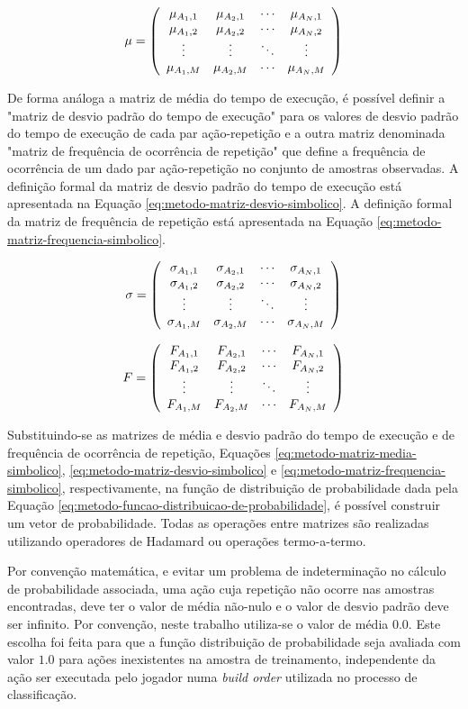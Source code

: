 \begin{equation}
	\mu =  \left(\begin{array}{cccc} {\mu}_{A_1,1} & {\mu}_{A_2,1} & \cdots & {\mu}_{A_N,1} \\ {\mu}_{A_1,2} & {\mu}_{A_2,2} & \cdots & {\mu}_{A_N,2} \\ \vdots & \vdots & \ddots & \vdots \\ {\mu}_{A_1,M} & {\mu}_{A_2,M} & \cdots & {\mu}_{A_N,M} \end{array}\right) 
	\label{eq:metodo-matriz-media-simbolico}
\end{equation}

De forma análoga a matriz de média do tempo de execução, é possível definir a "matriz de desvio padrão do tempo de execução" para os valores de desvio padrão do tempo de execução de cada par ação-repetição e a outra matriz denominada "matriz de frequência de ocorrência de repetição" que define a frequência de ocorrência de um dado par ação-repetição no conjunto de amostras observadas. A definição formal da matriz de desvio padrão do tempo de execução está apresentada na Equação \ref{eq:metodo-matriz-desvio-simbolico}. A definição formal da matriz de frequência de repetição está apresentada na Equação \ref{eq:metodo-matriz-frequencia-simbolico}.

\begin{equation}
	\sigma =  \left(\begin{array}{cccc} {\sigma}_{A_1,1} & {\sigma}_{A_2,1} & \cdots & {\sigma}_{A_N,1} \\ {\sigma}_{A_1,2} & {\sigma}_{A_2,2} & \cdots & {\sigma}_{A_N,2} \\ \vdots & \vdots & \ddots & \vdots \\ {\sigma}_{A_1,M} & {\sigma}_{A_2,M} & \cdots & {\sigma}_{A_N,M} \end{array}\right) 
	\label{eq:metodo-matriz-desvio-simbolico}
\end{equation}

\begin{equation}
	F =  \left(\begin{array}{cccc} {F}_{A_1,1} & {F}_{A_2,1} & \cdots & {F}_{A_N,1} \\ {F}_{A_1,2} & {F}_{A_2,2} & \cdots & {F}_{A_N,2} \\ \vdots & \vdots & \ddots & \vdots \\ {F}_{A_1,M} & {F}_{A_2,M} & \cdots & {F}_{A_N,M} \end{array}\right) 
	\label{eq:metodo-matriz-frequencia-simbolico}
\end{equation}


Substituindo-se as matrizes de média e desvio padrão do tempo de execução e de frequência de ocorrência de repetição, Equações \ref{eq:metodo-matriz-media-simbolico}, \ref{eq:metodo-matriz-desvio-simbolico} e \ref{eq:metodo-matriz-frequencia-simbolico}, respectivamente, na função de distribuição de probabilidade dada pela Equação \ref{eq:metodo-funcao-distribuicao-de-probabilidade}, é possível construir um vetor de probabilidade. Todas as operações entre matrizes são realizadas utilizando operadores de Hadamard ou operações termo-a-termo.

Por convenção matemática, e evitar um problema de indeterminação no cálculo de probabilidade associada, uma ação cuja repetição não ocorre nas amostras encontradas, deve ter o valor de média não-nulo e o valor de desvio padrão deve ser infinito. Por convenção, neste trabalho utiliza-se o valor de média $0.0$. Este escolha foi feita para que a função distribuição de probabilidade seja avaliada com valor $1.0$ para ações inexistentes na amostra de treinamento, independente da ação ser executada pelo jogador numa \textit{build order} utilizada no processo de classificação.

\newcommand{\RPME}[4]{
	\ensuremath{
		{#1} e^{-\frac{(#4-{#2})^2}{{{#3}}^2}}
	}
}
\newcommand{\RPMGE}[1]{
	\RPME{F_{{#1}}}{\mu_{{#1}}}{\sigma_{{#1}}}{t_{{#1}}}
}


